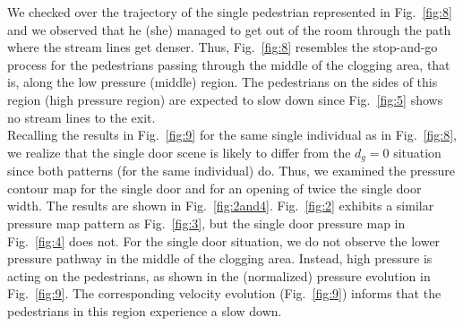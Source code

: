 We checked over the trajectory of the single pedestrian represented in 
Fig.~\ref{fig:8} and we observed that he (she) managed to get out of the room 
through the path where the stream lines get denser. Thus, Fig.~\ref{fig:8} 
resembles the stop-and-go process for the pedestrians passing through the 
middle of the clogging area, that is, along the low pressure (middle)
region. The pedestrians on the sides of this region (high pressure region) are 
expected to slow down since Fig.~\ref{fig:5} shows no stream lines to the exit. 
\\

Recalling the results in Fig.~\ref{fig:9} for the same single individual as in 
Fig.~\ref{fig:8}, we realize that the single door scene is likely 
to differ from the $d_g=0$ situation since both patterns (for the same 
individual) do. Thus, we examined the pressure contour map for the single door 
and for an opening of twice the single door width. The results are shown in 
Fig.~\ref{fig:2and4}. Fig.~\ref{fig:2} exhibits a similar pressure map pattern 
as Fig.~\ref{fig:3}, but the single door pressure map in Fig.~\ref{fig:4} does 
not. For the single door situation, we do not observe the lower pressure 
pathway in the middle of the clogging area. Instead, high pressure 
is acting on the pedestrians, as shown in the (normalized) pressure evolution 
in Fig.~\ref{fig:9}. The corresponding velocity evolution (Fig.~\ref{fig:9}) 
informs that the pedestrians in this region experience a slow down. \\



